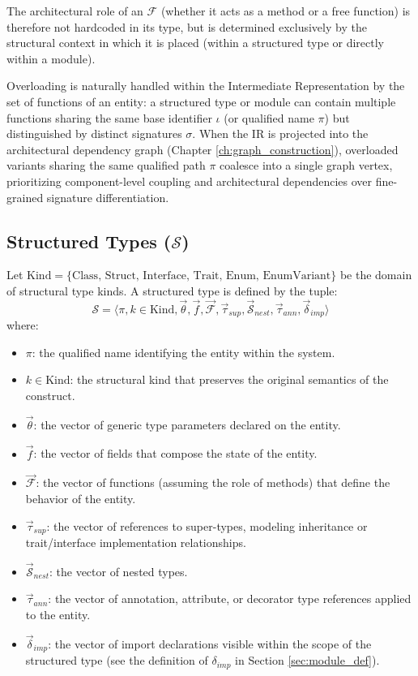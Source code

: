 The architectural role of an $\mathcal{F}$ (whether it acts as a
method or a free function) is therefore not hardcoded in its type, but is
determined exclusively by the structural context in which it is
placed (within a structured type or directly within a module).

Overloading is naturally handled within the Intermediate Representation
by the set of functions of an entity: a structured type or module can contain
multiple functions sharing the same base identifier $\iota$ (or qualified name
$\pi$) but distinguished by distinct signatures $\sigma$. When the IR is
projected into the architectural dependency graph (Chapter
\ref{ch:graph_construction}),
overloaded variants sharing the same qualified path $\pi$ coalesce into a
single graph vertex, prioritizing component-level coupling and architectural
dependencies over fine-grained signature differentiation.

\subsection{Structured Types ($\mathcal{S}$)}
Let $\text{Kind} = \{ \text{Class, Struct, Interface, Trait, Enum,
EnumVariant} \}$ be the domain of structural type kinds. A
structured type is defined by the tuple:
$$\mathcal{S} = \langle \pi, k \in \text{Kind}, \vec{\theta}, \vec{f},
\vec{\mathcal{F}}, \vec{\tau}_{sup}, \vec{\mathcal{S}}_{nest},
\vec{\tau}_{ann}, \vec{\delta}_{imp} \rangle$$
where:
\begin{itemize}
  \item $\pi$: the qualified name identifying the entity within the system.
  \item $k \in \text{Kind}$: the structural kind that
    preserves the original semantics of the construct.
  \item $\vec{\theta}$: the vector of generic type parameters
    declared on the entity.
  \item $\vec{f}$: the vector of fields that compose the state of the entity.
  \item $\vec{\mathcal{F}}$: the vector of functions (assuming the role
    of methods) that define the behavior of the entity.
  \item $\vec{\tau}_{sup}$: the vector of references to super-types,
    modeling inheritance or trait/interface implementation relationships.
  \item $\vec{\mathcal{S}}_{nest}$: the vector of nested types.
  \item $\vec{\tau}_{ann}$: the vector of annotation, attribute, or
    decorator type references applied to the entity.
  \item $\vec{\delta}_{imp}$: the vector of import declarations
    visible within the scope of the structured type (see the
    definition of $\delta_{imp}$ in Section \ref{sec:module_def}).
\end{itemize}

